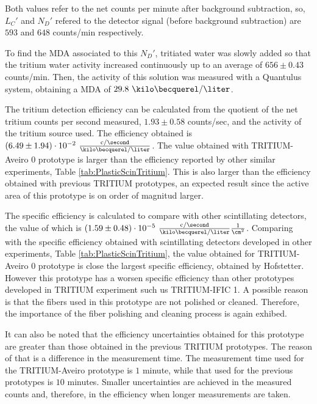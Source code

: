 Both values refer to the net counts per minute after background subtraction, so, $L_C'$ and $N_D'$ refered to the detector signal (before background subtraction) are $593$ and $648$ counts/min respectively.

To find the MDA associated to this $N_D'$, tritiated water was slowly added  so that the tritium water activity increased continuously up to an average of $656 \pm 0.43$ counts/min. Then, the activity of this solution was measured with a Quantulus system, obtaining a MDA of $29.8~\kilo\becquerel/\liter$.

The tritium detection efficiency can be calculated from the quotient of the net tritium counts per second measured, $1.93 \pm 0.58$ counts/sec, and the activity of the tritium source used. The efficiency obtained is $(6.49 \pm 1.94)\cdot{} 10^{-2}~ \frac{\text{c}/\second}{\kilo\becquerel/\liter}$.  The value obtained with TRITIUM-Aveiro 0 prototype is larger than the efficiency reported by other similar experiments, Table \ref{tab:PlasticScinTritium}. This is also larger than the efficiency obtained with previous TRITIUM prototypes, an expected result since the active area of this prototype is on order of magnitud larger.

The specific efficiency is calculated to compare with other scintillating detectors, the value of which is $(1.59 \pm 0.48)\cdot{} 10^{-5}~ \frac{\text{c}/\second}{\kilo\becquerel/\liter}\frac{1}{\cm^{2}}$. Comparing with the specific efficiency obtained with scintillating detectors developed in other experiments, Table \ref{tab:PlasticScinTritium}, the value obtained for TRITIUM-Aveiro 0 prototype is close the largest specific efficiency, obtained by Hofstetter. However this prototype has a worsen specific efficiency than other prototypes developed in TRITIUM experiment such us TRITIUM-IFIC 1. A possible reason is that the fibers used in this prototype are not polished or cleaned. Therefore, the importance of the fiber polishing and cleaning process is again exhibed.

It can also be noted that the efficiency uncertainties obtained for this prototype are greater than those obtained in the previous TRITIUM prototypes. The reason of that is a difference in the measurement time. The measurement time used for the TRITIUM-Aveiro prototype is $1$ minute, while that used for the previous prototypes is $10$ minutes. Smaller uncertainties are achieved in the measured counts and, therefore, in the efficiency when longer measurements are taken.

